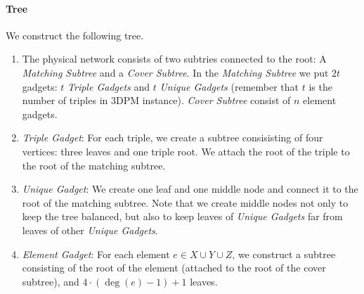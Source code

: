 \documentclass[preprint,12pt]{elsarticle}
\newcommand{\TDPM}{\textsc{3DPM}}
\newcommand{\MatchSubtree}{{\emph{Matching Subtree}}}
\newcommand{\CoverSubtree}{{\emph{Cover Subtree}}}
\newcommand{\TripleGadget}{{\emph{Triple Gadget}}}
\newcommand{\TripleGadgets}{{\emph{Triple Gadgets}}}
\newcommand{\UnqGadget}{{\emph{Unique Gadget}}}
\newcommand{\UnqGadgets}{{\emph{Unique Gadgets}}}
\newcommand{\ElGadget}{{\emph{Element Gadget}}}
\begin{document}
\paragraph{Tree}
We construct the following tree.
\begin{enumerate}
  \item The physical network consists of two subtries connected to the root: A {\MatchSubtree}
  and a {\CoverSubtree}. In the {\MatchSubtree} we put $2t$ gadgets:
  $t$ {\TripleGadgets} and $t$ {\UnqGadgets} (remember that $t$ is the
  number of triples in {\TDPM} instance). {\CoverSubtree} consist of
  $n$ element gadgets.
  \item \TripleGadget: For each triple, we create a subtree
  consisisting of four vertices: three leaves and one triple root.  We
  attach the root of the triple to the root of the matching subtree.
  \item \UnqGadget: We create one leaf and one middle node and connect
  it to the root of the matching subtree.  Note that we create middle
  nodes not only to keep the tree balanced, but also to keep leaves of
  {\UnqGadgets} far from leaves of other \UnqGadgets.
  \item \ElGadget: For each element $e \in X\cup Y\cup Z$, we
  construct a subtree consisting of the root of the element (attached
  to the root of the cover subtree), and $4\cdot(\deg(e)-1)+1$ leaves.
\end{enumerate}
\end{document}
